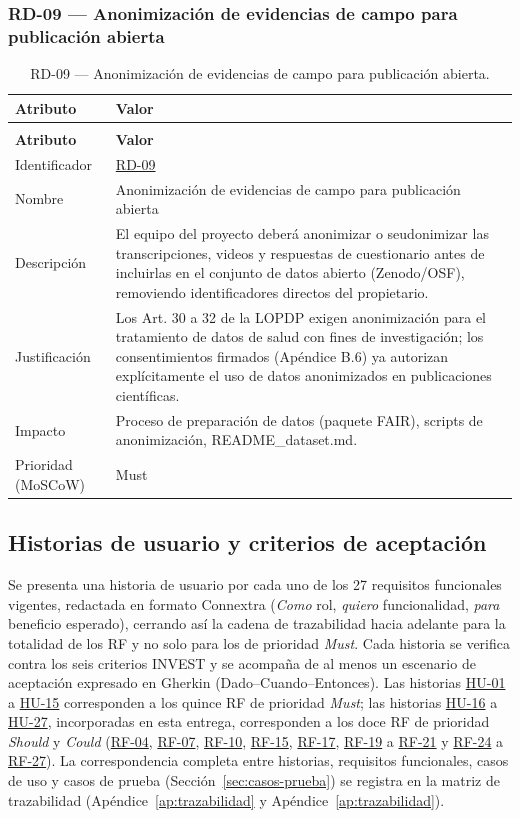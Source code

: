 \documentclass[journal,onecolumn]{IEEEtran}
\makeatletter
\newenvironment{atributos}[2]{%
	\small
	\begin{longtable}{@{}>{\raggedright\arraybackslash}p{4.2cm} >{\raggedright\arraybackslash}p{11.2cm}@{}}
		\caption{#2}\label{tab:#1}\\
		\toprule
		\textbf{Atributo} & \textbf{Valor} \\
		\midrule
		\endfirsthead
		\multicolumn{2}{@{}l}{\small\itshape (continuación)}\\
		\toprule
		\textbf{Atributo} & \textbf{Valor} \\
		\midrule
		\endhead
		\bottomrule
		\endlastfoot
	}{%
	\end{longtable}
	\normalsize
}
\makeatother
\begin{document}
	\subsubsection{RD-09 --- Anonimización de evidencias de campo para publicación abierta}
	
	\begin{atributos}{RD-09}{RD-09 --- Anonimización de evidencias de campo para publicación abierta.}
		Identificador & \hyperref[tab:RD-09]{RD-09} \\
		Nombre & Anonimización de evidencias de campo para publicación abierta \\
		Descripción & El equipo del proyecto deberá anonimizar o seudonimizar las transcripciones, videos y respuestas de cuestionario antes de incluirlas en el conjunto de datos abierto (Zenodo/OSF), removiendo identificadores directos del propietario. \\
		Justificación & Los Art. 30 a 32 de la LOPDP exigen anonimización para el tratamiento de datos de salud con fines de investigación; los consentimientos firmados (Apéndice B.6) ya autorizan explícitamente el uso de datos anonimizados en publicaciones científicas. \\
		Impacto & Proceso de preparación de datos (paquete FAIR), scripts de anonimización, README\_dataset.md. \\
		Prioridad (MoSCoW) & Must \\
	\end{atributos}
	
	
	\subsection{Historias de usuario y criterios de aceptación}
	\label{sec:historias}
	
	Se presenta una historia de usuario por cada uno de los 27 requisitos
	funcionales vigentes, redactada en formato Connextra (\emph{Como} rol,
	\emph{quiero} funcionalidad, \emph{para} beneficio esperado), cerrando así
	la cadena de trazabilidad hacia adelante para la totalidad de los RF y no
	solo para los de prioridad \emph{Must}. Cada historia se verifica contra
	los seis criterios INVEST \cite{cohn2004} y se acompaña de al menos un
	escenario de aceptación expresado en Gherkin (Dado--Cuando--Entonces). Las
	historias \hyperref[tab:HU-01]{HU-01} a \hyperref[tab:HU-15]{HU-15} corresponden a los quince RF de prioridad
	\emph{Must}; las historias \hyperref[tab:HU-16]{HU-16} a \hyperref[tab:HU-27]{HU-27}, incorporadas en esta entrega,
	corresponden a los doce RF de prioridad \emph{Should} y \emph{Could}
	(\hyperref[tab:RF-04]{RF-04}, \hyperref[tab:RF-07]{RF-07}, \hyperref[tab:RF-10]{RF-10}, \hyperref[tab:RF-15]{RF-15}, \hyperref[tab:RF-17]{RF-17}, \hyperref[tab:RF-19]{RF-19} a \hyperref[tab:RF-21]{RF-21} y \hyperref[tab:RF-24]{RF-24} a \hyperref[tab:RF-27]{RF-27}). La
	correspondencia completa entre historias, requisitos funcionales, casos de
	uso y casos de prueba (Sección~\ref{sec:casos-prueba}) se registra en la
	matriz de trazabilidad (Apéndice~\ref{ap:trazabilidad} y
	Apéndice~\ref{ap:trazabilidad}).
	
\end{document}
